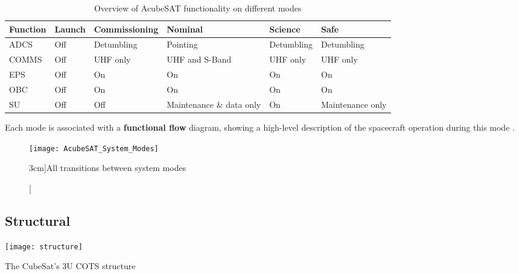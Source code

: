 \documentclass[a4paper,nobib,final]{tufte-book}
\begin{document}
\begin{table}[h]
	\centering
	\caption{Overview of AcubeSAT functionality on different modes}
	\label{tab:acubesatmodes}
	\begin{tabular}{@{}llllll@{}}
		\toprule
		Function    & Launch & Commissioning  & Nominal                 & Science        & Safe             \\ \midrule
		\acs{ADCS}  & \color{off} Off    & Detumbling     & \color{on} Pointing                & Detumbling     & Detumbling       \\
		\acs{COMMS} & \color{off} Off    & \acs{UHF} only & \color{on} \acs{UHF} and S-Band    & \acs{UHF} only & \acs{UHF} only   \\
		\acs{EPS}   & \color{off} Off    & \color{on} On             & \color{on} On                      & \color{on} On             & \color{on} On               \\
		\acs{OBC}   & \color{off} Off    & \color{on} On             & \color{on} On                      & \color{on} On             & \color{on} On               \\
		\acs{SU}    & \color{off} Off    & \color{off} Off            & Maintenance \& data only & \color{on} On             & Maintenance only \\ \bottomrule
	\end{tabular}
	\vspace{1em}
\end{table}


Each mode is associated with a \textbf{functional flow} diagram, showing a high-level description of the spacecraft operation during this mode \autocite{acubesatteam_acubesat_functional_2021}.

\begin{figure}
	\centering
	\texttt{[image: AcubeSAT\_System\_Modes]}
	\caption[All transitions between system modes][3cm]{All transitions between system modes \parencite{acubesatteam_acubesat_functional_2021}}
	\label{fig:transitions}
\end{figure}


\subsection{Structural}

\begin{marginfigure}[2cm]
	\centering
	\texttt{[image: structure]}
	\caption{The CubeSat's 3U \acs{COTS} structure}
	\label{fig:structure}
\end{marginfigure}
\end{document}
